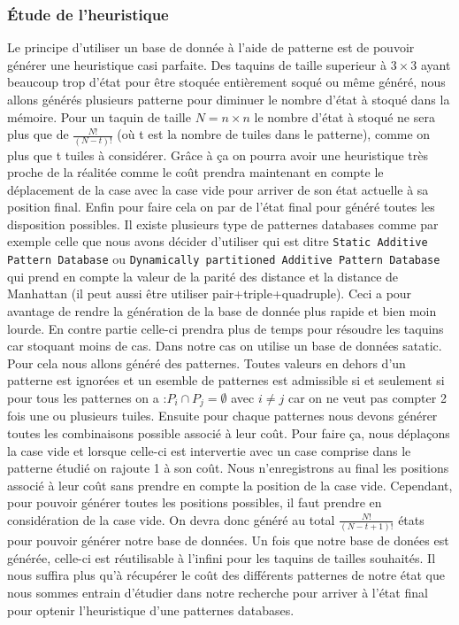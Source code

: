 \documentclass[a4paper, 12pt]{article}
\begin{document}
\subsubsection{Étude de l'heuristique}
Le principe d'utiliser un base de donnée à l'aide de patterne est de pouvoir générer une heuristique casi parfaite. Des taquins de taille superieur à $3 \times 3$ ayant beaucoup trop d'état pour être stoquée entièrement soqué ou même généré, nous allons générés plusieurs patterne pour diminuer le nombre d'état à stoqué dans la mémoire. Pour un taquin de taille $N = n \times n$ le nombre d'état à stoqué ne sera plus que de $\frac{N!}{(N-t)!}$ (où t est la nombre de tuiles dans le patterne), comme on plus que t tuiles à considérer. Grâce à ça on pourra avoir une heuristique très proche de la réalitée comme le coût prendra maintenant en compte le déplacement de la case avec la case vide pour arriver de son état actuelle à sa position final. Enfin pour faire cela on par de l'état final pour généré toutes les disposition possibles.
Il existe plusieurs type de patternes databases comme par exemple celle que nous avons décider d'utiliser qui est ditre \lstinline{Static Additive Pattern Database} ou \lstinline{Dynamically partitioned Additive Pattern Database} qui prend en compte la valeur de la parité des distance et la distance de Manhattan (il peut aussi être utiliser pair+triple+quadruple). Ceci a pour avantage de rendre la génération de la base de donnée plus rapide et bien moin lourde. En contre partie celle-ci prendra plus de temps pour résoudre les taquins car stoquant moins de cas. Dans notre cas on utilise un base de données satatic. Pour cela nous allons généré des patternes. Toutes valeurs en dehors d'un patterne est ignorées et un esemble de patternes est admissible si et seulement si pour tous les patternes on a :$P_{i} \cap P_{j} = \emptyset$ avec $i \neq j$ car on ne veut pas compter 2 fois une ou plusieurs tuiles. Ensuite pour chaque patternes nous devons générer toutes les combinaisons possible associé à leur coût. Pour faire ça, nous déplaçons la case vide et lorsque celle-ci est intervertie avec un case comprise dans le patterne étudié on rajoute 1 à son coût. Nous n'enregistrons au final les positions associé à leur coût sans prendre en compte la position de la case vide. Cependant, pour pouvoir générer toutes les positions possibles, il faut prendre en considération de la case vide. On devra donc généré au total $\frac{N!}{(N-t+1)!}$ états pour pouvoir générer notre base de données.
Un fois que notre base de donées est générée, celle-ci est réutilisable à l'infini pour les taquins de tailles souhaités. Il nous suffira plus qu'à récupérer le coût des différents patternes de notre état que nous sommes entrain d'étudier dans notre recherche pour arriver à l'état final pour optenir l'heuristique d'une patternes databases.
\end{document}
